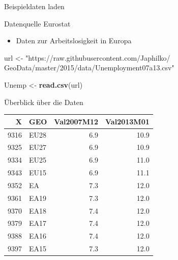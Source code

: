\documentclass[ignorenonframetext,]{beamer}
\newenvironment{Shaded}{\begin{snugshade}}{\end{snugshade}}
\newcommand{\KeywordTok}[1]{\textcolor[rgb]{0.13,0.29,0.53}{\textbf{#1}}}
\newcommand{\NormalTok}[1]{#1}
\newcommand{\StringTok}[1]{\textcolor[rgb]{0.31,0.60,0.02}{#1}}
\providecommand{\tightlist}{%
  \setlength{\itemsep}{0pt}\setlength{\parskip}{0pt}}
\begin{document}
\begin{frame}[fragile]{Beispieldaten laden}
\protect\hypertarget{beispieldaten-laden}{}

\begin{block}{Datenquelle Eurostat}

\begin{itemize}
\tightlist
\item
  Daten zur Arbeitslosigkeit in Europa
\end{itemize}

\begin{Shaded}
\begin{Highlighting}[]
\NormalTok{url <-}\StringTok{ "https://raw.githubusercontent.com/Japhilko/}
\StringTok{GeoData/master/2015/data/Unemployment07a13.csv"}

\NormalTok{Unemp <-}\StringTok{ }\KeywordTok{read.csv}\NormalTok{(url) }
\end{Highlighting}
\end{Shaded}

\end{block}

\end{frame}

\begin{frame}{Überblick über die Daten}
\protect\hypertarget{uberblick-uber-die-daten}{}

\begin{longtable}[]{@{}rlrr@{}}
\toprule
X & GEO & Val2007M12 & Val2013M01\tabularnewline
\midrule
\endhead
9316 & EU28 & 6.9 & 10.9\tabularnewline
9325 & EU27 & 6.9 & 10.9\tabularnewline
9334 & EU25 & 6.9 & 11.0\tabularnewline
9343 & EU15 & 6.9 & 11.1\tabularnewline
9352 & EA & 7.3 & 12.0\tabularnewline
9361 & EA19 & 7.3 & 12.0\tabularnewline
9370 & EA18 & 7.4 & 12.0\tabularnewline
9379 & EA17 & 7.4 & 12.0\tabularnewline
9388 & EA16 & 7.4 & 12.0\tabularnewline
9397 & EA15 & 7.3 & 12.0\tabularnewline
\bottomrule
\end{longtable}

\end{frame}
\end{document}
